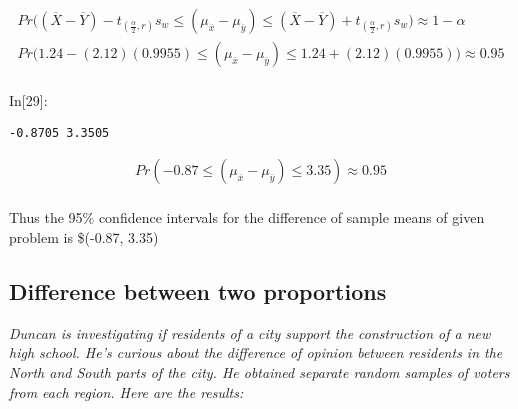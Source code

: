 \documentclass[float=false,crop=false]{standalone}
\begin{document}
    \[
    \begin{aligned}
        Pr\Big(  (\overline{X} - \overline{Y}) - t_{(\frac{\alpha}{2},r)}s_w \leq (\mu_{\overline{x}} - \mu_{\overline{y}}) \leq    (\overline{X} - \overline{Y}) + t_{(\frac{\alpha}{2},r)}s_w\Big) \approx 1-\alpha  \nonumber \\    
        Pr\Big(  1.24 - (2.12)(0.9955) \leq (\mu_{\overline{x}} - \mu_{\overline{y}}) \leq      1.24 + (2.12)(0.9955)\Big) \approx 0.95  \nonumber \\    
    \end{aligned}   
\]
\begin{InVerbatim}[commandchars=\\\{\},fontsize=\scriptsize]
{\color{incolor}In[{\color{incolor}29}]:}        
          
\end{InVerbatim}
    \begin{Verbatim}[commandchars=\\\{\},fontsize=\footnotesize]
-0.8705 3.3505

    \end{Verbatim}

    \[
    \begin{aligned}
        Pr( -0.87 \leq (\mu_{\overline{x}} - \mu_{\overline{y}}) \leq   3.35) \approx 0.95  \nonumber \\    
    \end{aligned}   
\]

Thus the 95\% confidence intervals for the difference of sample means of
given problem is \$(-0.87, 3.35)

    \subsection{Difference between two
proportions}\label{difference-between-two-proportions}

\emph{Duncan is investigating if residents of a city support the
construction of a new high school. He's curious about the difference of
opinion between residents in the North and South parts of the city. He
obtained separate random samples of voters from each region. Here are
the results:}
\end{document}
